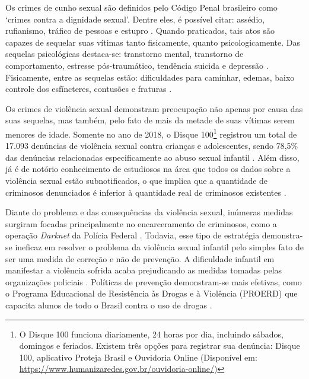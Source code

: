 \documentclass[alpha-refs,brazilian]{RBCA_v2.0}
\begin{document}
Os crimes de cunho sexual são definidos pelo Código Penal brasileiro como `crimes contra a dignidade sexual'. Dentre eles, é possível citar: assédio, rufianismo, tráfico de pessoas e estupro \citep{codigo2018crimes}. Quando praticados, tais atos são capazes de sequelar suas vítimas tanto fisicamente, quanto psicologicamente. Das sequelas psicológicas destaca-se: transtorno mental, transtorno de comportamento, estresse pós-traumático, tendência suicida e depressão \citep{cerqueira2014estupro}. Fisicamente, entre as sequelas estão: dificuldades para caminhar, edemas, baixo controle dos esfíncteres, contusões e fraturas \citep{bocardi2003gravidez, florentino2015possiveis}.

Os crimes de violência sexual demonstram preocupação não apenas por causa das suas sequelas, mas também, pelo fato de mais da metade de suas vítimas serem menores de idade. Somente no ano de 2018, o Disque 100\footnote{O Disque 100 funciona diariamente, 24 horas por dia, incluindo sábados, domingos e feriados. Existem três opções para registrar sua denúncia: Disque 100, aplicativo Proteja Brasil e Ouvidoria Online (Disponível em: \underline{\url{https://www.humanizaredes.gov.br/ouvidoria-online/}})} registrou um total de 17.093 denúncias de violência sexual contra crianças e adolescentes, sendo 78,5\% das denúncias relacionadas especificamente ao abuso sexual infantil \citep{ouvidoria2019balanco}. Além disso, já é de notório conhecimento de estudiosos na área que todos os dados sobre a violência sexual estão subnotificados, o que implica que a quantidade de criminosos denunciados é inferior à quantidade real de criminosos existentes \citep{world2016world}.

Diante do problema e das consequências da violência sexual, inúmeras medidas surgiram focadas principalmente no encarceramento de criminosos, como a operação \textit{Darknet} da Polícia Federal \citep{policia2017operacao}. Todavia, esse tipo de estratégia demonstra-se ineficaz em resolver o problema da violência sexual infantil pelo simples fato de ser uma medida de correção e não de prevenção. A dificuldade infantil em manifestar a violência sofrida acaba prejudicando as medidas tomadas pelas organizações policiais \citep{brito2015estupro}. Políticas de prevenção demonstram-se mais efetivas, como o Programa Educacional de Resistência às Drogas e à Violência (PROERD) que capacita alunos de todo o Brasil contra o uso de drogas \citep{vasconcelos2018eficacia}.

\pagebreak
\end{document}
